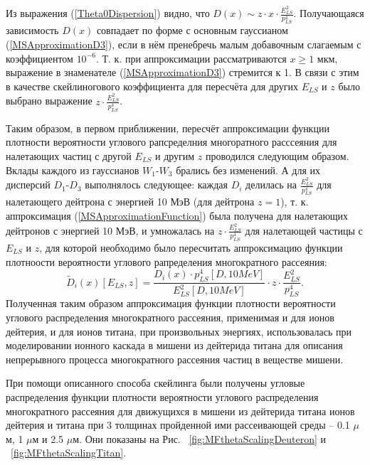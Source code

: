 \documentclass[a4paper,12pt]{article}
\begin{document}
\begin{large}
  Из выражения (\ref{Theta0Dispersion}) видно, что $D(x) \sim z \cdot x \cdot \frac{E^2_{LS}}{p^4_{LS}}$. Получающаяся зависимость $D(x)$ совпадает по форме с основным гауссианом (\ref{MSApproximationD3}), если в нём пренебречь малым добавочным слагаемым с коэффициентом $10^{-6}$. Т. к. при аппроксимации рассматриваются $x \geq 1$ мкм, выражение в знаменателе (\ref{MSApproximationD3}) стремится к 1. В связи с этим в качестве скейлиногового коэффициента для пересчёта для других $E_{LS}$ и $z$ было выбрано выражение $z \cdot \frac{E^2_{LS}}{p^4_{LS}}$.
  
  Таким образом, в первом приближении, пересчёт аппроксимации функции плотности вероятности углового рапсределния многоратного расссеяния для налетающих частиц с другой $E_{LS}$ и другим $z$ проводился следующим образом. Вклады каждого из гауссианов $W_1$-$W_3$ брались без изменений. А для их дисперсий $D_1$-$D_3$ выполнялось следующее: каждая $D_i$ делилась на $\frac{E^2_{LS}}{p^4_{LS}}$ для налетающего дейтрона с энергией 10 МэВ (для дейтрона $z=1$), т. к. аппроксимация (\ref{MSApproximationFunction}) была получена для налетающих дейтронов с энергией 10 МэВ, и умножалась на $z \cdot \frac{E^2_{LS}}{p^4_{LS}}$ для налетающей частицы с $E_{LS}$ и $z$, для которой необходимо было пересчитать аппроксимацию функции плотноости вероятности углового рапределения многократного рассеяния:
\begin{equation}
  \label{DispersionScaling}
   \tilde D_i(x)[E_{LS}, z]=\frac{D_i(x) \cdot p^{4}_{LS}[D, 10 MeV]}{E^{2}_{LS}[D, 10 MeV]} \cdot z \cdot \frac{E^{2}_{LS}}{p^{4}_{LS}}.
\end{equation}  
Полученная таким образом аппроксимация функции плотности вероятности углового распределения многократного рассеяния, применимая и для ионов дейтерия, и для ионов титана, при произвольных энергиях, использовалась при моделировании ионного каскада в мишени из дейтерида титана для описания непрерывного процесса многократного рассеяния частиц в веществе мишени.

	При помощи описанного способа скейлинга были получены угловые распределения функции плотности вероятности углового распределения многократного рассеяния для движущихся в мишени из дейтерида титана ионов дейтерия и титана при 3 толщинах пройденной ими рассеивающей среды -- 0.1 $\mu$м, 1 $\mu$м и 2.5 $\mu$м. Они показаны на Рис. ~\ref{fig:MFthetaScalingDeuteron} и ~\ref{fig:MFthetaScalingTitan}.
	

\end{large}
\end{document}
